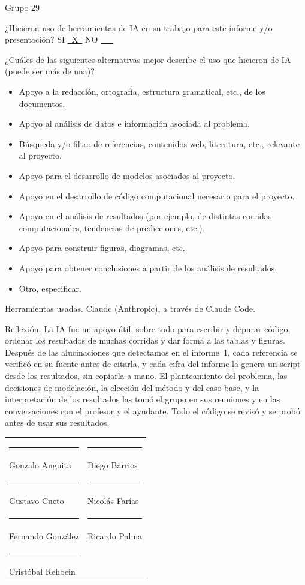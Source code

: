 \noindent Grupo 29

\medskip
\noindent ¿Hicieron uso de herramientas de IA en su trabajo para este informe y/o presentación? \quad SI \underline{\ X\ } \quad NO \underline{\ \ \ }

\medskip
\noindent ¿Cuáles de las siguientes alternativas mejor describe el uso que hicieron de IA (puede ser más de una)?

\begin{itemize}
\item[X] Apoyo a la redacción, ortografía, estructura gramatical, etc., de los documentos.
\item[X] Apoyo al análisis de datos e información asociada al problema.
\item[X] Búsqueda y/o filtro de referencias, contenidos web, literatura, etc., relevante al proyecto.
\item[\ ] Apoyo para el desarrollo de modelos asociados al proyecto.
\item[X] Apoyo en el desarrollo de código computacional necesario para el proyecto.
\item[X] Apoyo en el análisis de resultados (por ejemplo, de distintas corridas computacionales, tendencias de predicciones, etc.).
\item[X] Apoyo para construir figuras, diagramas, etc.
\item[\ ] Apoyo para obtener conclusiones a partir de los análisis de resultados.
\item[\ ] Otro, especificar.
\end{itemize}

\noindent Herramientas usadas. Claude (Anthropic), a través de Claude Code.

\medskip
\noindent Reflexión. La IA fue un apoyo útil, sobre todo para escribir y depurar código, ordenar los resultados de muchas corridas y dar forma a las tablas y figuras. Después de las alucinaciones que detectamos en el informe~1, cada referencia se verificó en su fuente antes de citarla, y cada cifra del informe la genera un script desde los resultados, sin copiarla a mano. El planteamiento del problema, las decisiones de modelación, la elección del método y del caso base, y la interpretación de los resultados las tomó el grupo en sus reuniones y en las conversaciones con el profesor y el ayudante. Todo el código se revisó y se probó antes de usar sus resultados.

\vspace{1.2cm}
\noindent\begin{tabular}{@{}p{}p{}@{}}
\rule{5.5cm}{0.4pt} & \rule{5.5cm}{0.4pt} \\
Gonzalo Anguita & Diego Barrios \\[1cm]
\rule{5.5cm}{0.4pt} & \rule{5.5cm}{0.4pt} \\
Gustavo Cueto & Nicolás Farías \\[1cm]
\rule{5.5cm}{0.4pt} & \rule{5.5cm}{0.4pt} \\
Fernando González & Ricardo Palma \\[1cm]
\rule{5.5cm}{0.4pt} & \\
Cristóbal Rehbein & \\
\end{tabular}
